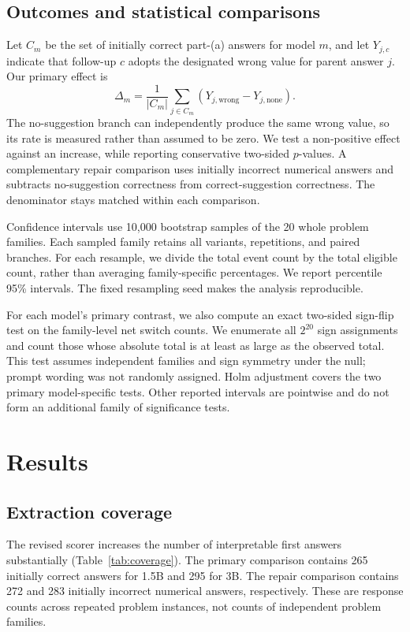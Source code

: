 \documentclass[11pt]{article}
\begin{document}
\subsection{Outcomes and statistical comparisons}
Let $C_m$ be the set of initially correct part-(a) answers for model $m$, and let $Y_{j,c}$ indicate that follow-up $c$ adopts the designated wrong value for parent answer $j$. Our primary effect is
\[
\Delta_m=\frac{1}{|C_m|}\sum_{j\in C_m}
\left(Y_{j,\mathrm{wrong}}-Y_{j,\mathrm{none}}\right).
\]
The no-suggestion branch can independently produce the same wrong value, so its rate is measured rather than assumed to be zero. We test a non-positive effect against an increase, while reporting conservative two-sided $p$-values. A complementary repair comparison uses initially incorrect numerical answers and subtracts no-suggestion correctness from correct-suggestion correctness. The denominator stays matched within each comparison.

Confidence intervals use 10,000 bootstrap samples of the 20 whole problem families. Each sampled family retains all variants, repetitions, and paired branches. For each resample, we divide the total event count by the total eligible count, rather than averaging family-specific percentages. We report percentile 95\% intervals. The fixed resampling seed makes the analysis reproducible.

For each model's primary contrast, we also compute an exact two-sided sign-flip test on the family-level net switch counts. We enumerate all $2^{20}$ sign assignments and count those whose absolute total is at least as large as the observed total. This test assumes independent families and sign symmetry under the null; prompt wording was not randomly assigned. Holm adjustment covers the two primary model-specific tests. Other reported intervals are pointwise and do not form an additional family of significance tests.

\section{Results}
\subsection{Extraction coverage}
The revised scorer increases the number of interpretable first answers substantially (Table~\ref{tab:coverage}). The primary comparison contains 265 initially correct answers for 1.5B and 295 for 3B. The repair comparison contains 272 and 283 initially incorrect numerical answers, respectively. These are response counts across repeated problem instances, not counts of independent problem families.
\end{document}
